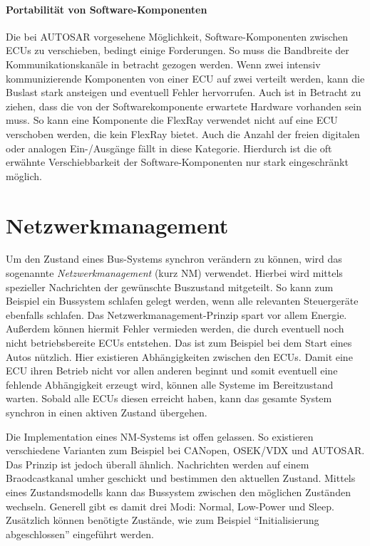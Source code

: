 \documentclass[
  a4paper,					    %
  twoside,
  DIV=calc,     				%
  bibliography=totoc,
  cleardoublepage=empty,
  ngerman,     					%
  final       					%
]{scrbook}
\begin{document}
\paragraph{Portabilität von Software-Komponenten}
Die bei AUTOSAR vorgesehene Möglichkeit, Software-Komponenten zwischen ECUs zu verschieben, bedingt einige Forderungen. So muss die Bandbreite der Kommunikationskanäle in betracht gezogen werden. Wenn zwei intensiv kommunizierende Komponenten von einer ECU auf zwei verteilt werden, kann die Buslast stark ansteigen und eventuell Fehler hervorrufen. Auch ist in Betracht zu ziehen, dass die von der Softwarekomponente erwartete Hardware vorhanden sein muss. So kann eine Komponente die FlexRay verwendet nicht auf eine ECU verschoben werden, die kein FlexRay bietet. Auch die Anzahl der freien digitalen oder analogen Ein-/Ausgänge fällt in diese Kategorie. Hierdurch ist die oft erwähnte Verschiebbarkeit der Software-Komponenten nur stark eingeschränkt möglich.






\section{Netzwerkmanagement}
\label{sec:Netzwerkmanagement}
Um den Zustand eines Bus-Systems synchron verändern zu können, wird das sogenannte \emph{Netzwerkmanagement} (kurz NM) verwendet. Hierbei wird mittels spezieller Nachrichten der gewünschte Buszustand mitgeteilt. So kann zum Beispiel ein Bussystem schlafen gelegt werden, wenn alle relevanten Steuergeräte ebenfalls schlafen. Das Netzwerkmanagement-Prinzip spart vor allem Energie. Außerdem können hiermit Fehler vermieden werden, die durch eventuell noch nicht betriebsbereite ECUs entstehen. Das ist zum Beispiel bei dem Start eines Autos nützlich. Hier existieren Abhängigkeiten zwischen den ECUs. Damit eine ECU ihren Betrieb nicht vor allen anderen beginnt und somit eventuell eine fehlende Abhängigkeit erzeugt wird, können alle Systeme im Bereitzustand warten. Sobald alle ECUs diesen erreicht haben, kann das gesamte System synchron in einen aktiven Zustand übergehen.

Die Implementation eines NM-Systems ist offen gelassen. So existieren verschiedene Varianten zum Beispiel bei CANopen, OSEK/VDX und AUTOSAR. Das Prinzip ist jedoch überall ähnlich. Nachrichten werden auf einem Braodcastkanal umher geschickt und bestimmen den aktuellen Zustand. Mittels eines Zustandsmodells kann das Bussystem zwischen den möglichen Zuständen wechseln. Generell gibt es damit drei Modi: Normal, Low-Power und Sleep. Zusätzlich können benötigte Zustände, wie zum Beispiel "`Initialisierung abgeschlossen"' eingeführt werden.
\end{document}
